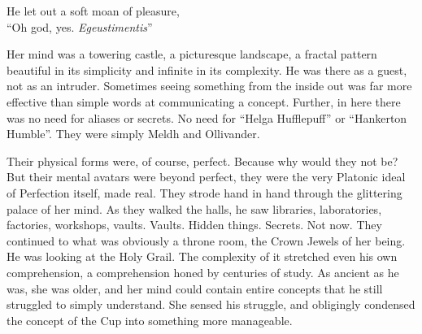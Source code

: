 He let out a soft moan of pleasure,\\“Oh god, yes. \emph{Egeustimentis}”
\begin{flushright}
Her mind was a towering castle, a picturesque landscape, a fractal pattern beautiful in its simplicity and infinite in its complexity. He was there as a guest, not as an intruder. Sometimes seeing something from the inside out was far more effective than simple words at communicating a concept. Further, in here there was no need for aliases or secrets. No need for “Helga Hufflepuff” or “Hankerton Humble”. They were simply Meldh and Ollivander.

Their physical forms were, of course, perfect. Because why would they not be? But their mental avatars were beyond perfect, they were the very Platonic ideal of Perfection itself, made real. They strode hand in hand through the glittering palace of her mind. As they walked the halls, he saw libraries, laboratories, factories, workshops, vaults.
\SmallVSpace
Vaults. Hidden things.
\SmallVSpace
Secrets.
\SmallVSpace
Not now. They continued to what was obviously a throne room, the Crown Jewels of her being. He was looking at the Holy Grail. The complexity of it stretched even his own comprehension, a comprehension honed by centuries of study. As ancient as he was, she was older, and her mind could contain entire concepts that he still struggled to simply understand. She sensed his struggle, and obligingly condensed the concept of the Cup into something more manageable.


\end{flushright}
